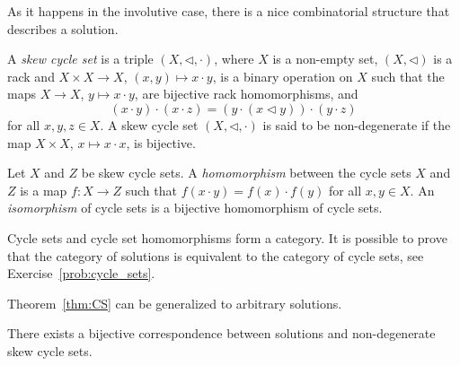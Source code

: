 As it happens in the involutive case, there is a nice combinatorial structure that describes  
a solution. 

\begin{definition}
\label{defn:skewCS}
A \emph{skew cycle set} is a triple $(X,\triangleleft,\cdot)$, where $X$ is a non-empty set, 
$(X,\triangleleft)$ is a rack and
$X\times X\to X$, $(x,y)\mapsto x\cdot y$, is a binary operation on $X$ such that the maps 
$X\to X$, $y\mapsto x\cdot y$, are bijective rack homomorphisms, and 
\begin{equation}
\label{eq:skew_CS}
(x\cdot y)\cdot (x\cdot z)=(y\cdot (x\triangleleft y))\cdot (y\cdot z)
\end{equation}
for all $x,y,z\in X$. A skew cycle set $(X,\triangleleft,\cdot)$ is said to be 
non-degenerate if the map $X\times X$, $x\mapsto x\cdot x$, is bijective.
\end{definition}


\begin{definition}
Let $X$ and $Z$ be skew cycle sets. 
A \emph{homomorphism} between the cycle sets $X$ and $Z$ is a 
map $f\colon X\to Z$ such that $f(x\cdot y)=f(x)\cdot f(y)$ for all $x,y\in X$. An \emph{isomorphism} of cycle sets
is a bijective homomorphism of cycle sets. 
\end{definition}

Cycle sets and cycle set homomorphisms form a category. 
It is possible to prove that the category of 
solutions is equivalent to the category of cycle sets, 
see Exercise~\ref{prob:cycle_sets}. 


Theorem~\ref{thm:CS} can be generalized to arbitrary solutions.

\begin{theorem}
\label{thm:skewCS}
There exists a bijective correspondence between solutions 
and non-degenerate skew cycle sets. 
\end{theorem}


